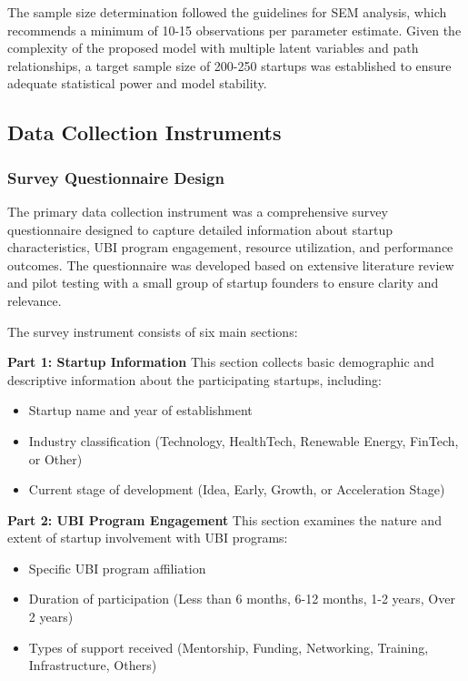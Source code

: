 \documentclass[../Main.tex]{subfiles}%
\begin{document}
	The sample size determination followed the guidelines for SEM analysis, which recommends a minimum of 10-15 observations per parameter estimate. Given the complexity of the proposed model with multiple latent variables and path relationships, a target sample size of 200-250 startups was established to ensure adequate statistical power and model stability.
	
	\subsection{Data Collection Instruments}
	
	\subsubsection{Survey Questionnaire Design}
	The primary data collection instrument was a comprehensive survey questionnaire designed to capture detailed information about startup characteristics, UBI program engagement, resource utilization, and performance outcomes. The questionnaire was developed based on extensive literature review and pilot testing with a small group of startup founders to ensure clarity and relevance.
	
	The survey instrument consists of six main sections:
	
	\textbf{Part 1: Startup Information}
	This section collects basic demographic and descriptive information about the participating startups, including:
	\begin{itemize}
		\item Startup name and year of establishment
		\item Industry classification (Technology, HealthTech, Renewable Energy, FinTech, or Other)
		\item Current stage of development (Idea, Early, Growth, or Acceleration Stage)
	\end{itemize}
	
	\textbf{Part 2: UBI Program Engagement}
	This section examines the nature and extent of startup involvement with UBI programs:
	\begin{itemize}
		\item Specific UBI program affiliation
		\item Duration of participation (Less than 6 months, 6-12 months, 1-2 years, Over 2 years)
		\item Types of support received (Mentorship, Funding, Networking, Training, Infrastructure, Others)
	\end{itemize}
	
\end{document}
